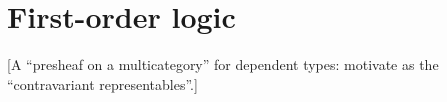 \chapter{First-order logic}
\label{chap:fol}

[A ``presheaf on a multicategory'' for dependent types: motivate as the ``contravariant representables''.]


